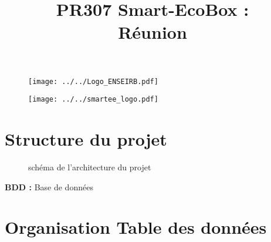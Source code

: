 \documentclass[10pt,a4paper]{article}
\title{PR307 Smart-EcoBox : \\ Réunion}
\begin{document}
\maketitle

\begin{figure}[ht]
\begin{center}
\noindent \texttt{[image: ../../Logo\_ENSEIRB.pdf]}
\end{center}
\end{figure}
\begin{figure}[ht]
\begin{center}
\noindent \texttt{[image: ../../smartee\_logo.pdf]}
\end{center}
\end{figure}


\newpage

\tableofcontents
\newpage
\section {Structure du projet}

\begin{figure}[h]
\centering
\caption{schéma de l'architecture du projet}
\label{fig:my_label}
\end{figure}

\textbf{BDD :} Base de données
\section{Organisation Table des données}
\end{document}
